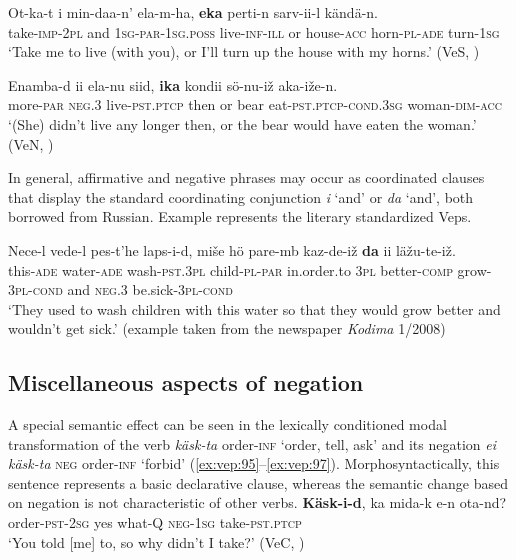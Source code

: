 \documentclass[output=paper,colorlinks=true, citecolor=brown]{langscibook}
\begin{document}
\ea
    \label{ex:vep:92}
    \gll  Ot-ka-t  i min-daa-n’ ela-m-ha, \textbf{eka} perti-n sarv-ii-l kändä-n. \\
         take-\textsc{imp-2pl} and \textsc{1sg-par-1sg.poss} live-\textsc{inf-ill} or house-\textsc{acc} horn-\textsc{pl-ade} turn-\textsc{1sg}\\
    \glt ‘Take me to live (with you), or I’ll turn up the house with my horns.’ (VeS, \citealt[44]{Kettunen1925})
\z

\ea
    \label{ex:vep:93}
    \gll Enamba-d ii ela-nu siid, \textbf{ika} kondii sö{}-nu{}-iž  aka{}-iže{}-n. \\
         more-\textsc{par} \textsc{neg.3} live-\textsc{pst.ptcp} then or bear eat-\textsc{pst.ptcp{}-cond.3sg} woman-\textsc{dim}{}-\textsc{acc}\\
    \glt ‘(She) didn’t live any longer then, or the bear would have eaten the woman.’ (VeN, \citealt[185]{MSFOu70})
\z

In general, affirmative and negative phrases may occur as coordinated clauses that display the standard coordinating conjunction \textit{i} ‘and’ or \textit{da} ‘and’, both borrowed from Russian. Example  represents the literary standardized Veps.

\ea
    \label{ex:vep:94}
    \gll Nece{}-l vede{}-l pes{}-t’he  laps{}-i{}-d,  miše  hö pare-mb  kaz-de-iž  \textbf{da} ii läžu-te-iž. \\
        this-\textsc{ade} water-\textsc{ade}  wash-\textsc{pst.3pl} child-\textsc{pl-par} in.order.to \textsc{3pl} 
        better-\textsc{comp} grow-\textsc{3pl-cond} and \textsc{neg.3} be.sick-\textsc{3pl-cond}\\
    \glt ‘They used to wash children with this water so that they would grow better and wouldn’t get sick.’ (example taken from the newspaper \textit{Kodima} 1/2008)
\z 

\subsection{Miscellaneous aspects of negation}\label{sec:vep:4.6}

A special semantic effect can be seen in the lexically conditioned modal transformation of the verb \textit{käsk-ta} order\textsc{{}-inf} ‘order, tell, ask’ and its negation \textit{ei käsk-ta} \textsc{neg} order\textsc{{}-inf} ‘forbid’ (\ref{ex:vep:95}–\ref{ex:vep:97}). Morphosyntactically, this sentence represents a basic declarative clause, whereas the semantic change based on negation is not characteristic of other verbs.
\ea\label{ex:vep:95} 
    \gll  \textbf{Käsk-i-d}, ka mida-k e-n ota-nd?\\ 
          order-\textsc{pst-2sg} yes what-Q \textsc{neg-1sg} take-\textsc{pst.ptcp}\\
    \glt ‘You told [me] to, so why didn’t I take?’ (VeC, \citealt[107]{MSFOu70})
\z 
\end{document}
